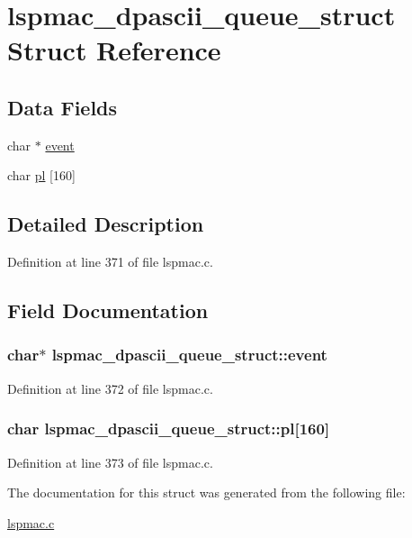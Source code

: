 \hypertarget{structlspmac__dpascii__queue__struct}{\section{lspmac\-\_\-dpascii\-\_\-queue\-\_\-struct Struct Reference}
\label{structlspmac__dpascii__queue__struct}
}
\subsection*{Data Fields}
\begin{DoxyCompactItemize}
\item 
char $\ast$ \hyperlink{structlspmac__dpascii__queue__struct_a8775c09713a917f4ddd80a3a5a8a4668}{event}
\item 
char \hyperlink{structlspmac__dpascii__queue__struct_a318d65317b14eba9e38efd0ab0133a5c}{pl} \mbox{[}160\mbox{]}
\end{DoxyCompactItemize}


\subsection{Detailed Description}


Definition at line 371 of file lspmac.\-c.



\subsection{Field Documentation}
\hypertarget{structlspmac__dpascii__queue__struct_a8775c09713a917f4ddd80a3a5a8a4668}{
\subsubsection[{event}]{\setlength{\rightskip}{0pt plus 5cm}char$\ast$ lspmac\-\_\-dpascii\-\_\-queue\-\_\-struct\-::event}}\label{structlspmac__dpascii__queue__struct_a8775c09713a917f4ddd80a3a5a8a4668}


Definition at line 372 of file lspmac.\-c.

\hypertarget{structlspmac__dpascii__queue__struct_a318d65317b14eba9e38efd0ab0133a5c}{
\subsubsection[{pl}]{\setlength{\rightskip}{0pt plus 5cm}char lspmac\-\_\-dpascii\-\_\-queue\-\_\-struct\-::pl\mbox{[}160\mbox{]}}}\label{structlspmac__dpascii__queue__struct_a318d65317b14eba9e38efd0ab0133a5c}


Definition at line 373 of file lspmac.\-c.



The documentation for this struct was generated from the following file\-:\begin{DoxyCompactItemize}
\item 
\hyperlink{lspmac_8c}{lspmac.\-c}\end{DoxyCompactItemize}
